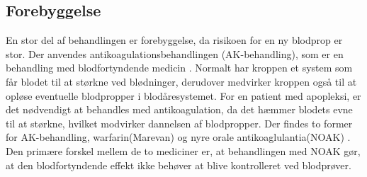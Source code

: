 \subsection{Forebyggelse}
En stor del af behandlingen er forebyggelse, da risikoen for en ny blodprop er stor. Der anvendes antikoagulationsbehandlingen (AK-behandling), som er en behandling med blodfortyndende medicin \cite{Kjaergaard2015}. Normalt har kroppen et system som får blodet til at størkne ved blødninger, derudover medvirker kroppen også til at opløse eventuelle blodpropper i blodåresystemet. For en patient med apopleksi, er det nødvendigt at behandles med antikoagulation, da det hæmmer blodets evne til at størkne, hvilket modvirker dannelsen af blodpropper. Der findes to former for AK-behandling, warfarin(Marevan) og nyre orale antikoaglulantia(NOAK) \cite{Kjaergaard2015}. Den primære forskel mellem de to mediciner er, at behandlingen med NOAK gør, at den blodfortyndende effekt ikke behøver at blive kontrolleret ved blodprøver.\cite{Kjaergaard2015}

